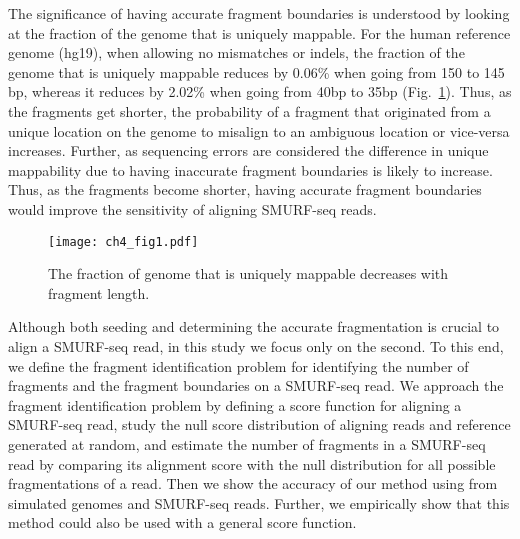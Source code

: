 The significance of having accurate fragment boundaries is understood by
looking at the fraction of the genome that is uniquely mappable. For the
human reference genome (hg19), when allowing no mismatches or indels,
the fraction of the genome that is uniquely mappable reduces by 0.06\%
when going from 150 to 145 bp, whereas it reduces by 2.02\% when going
from 40bp to 35bp (Fig.~\ref{dzones}).
Thus, as the fragments get shorter, the probability of a fragment that
originated from a unique location on the genome to misalign to an
ambiguous location or vice-versa increases.
Further, as sequencing errors are considered the difference in unique
mappability due to having inaccurate fragment boundaries is likely to
increase.
%
Thus, as the fragments become shorter, having accurate fragment
boundaries would improve the sensitivity of aligning SMURF-seq reads.

\begin{figure}[t!]
\centering
\texttt{[image: ch4\_fig1.pdf]}
\caption[Uniquely mappable fraction of the genome decreases fragment
  length]{
  The fraction of genome that is uniquely mappable decreases with
  fragment length.}
\label{dzones}
\end{figure}


Although both seeding and determining the accurate fragmentation is
crucial to align a SMURF-seq read, in this study we focus only on the
second. To this end, we define the fragment identification problem for
identifying the number of fragments and the fragment boundaries on a
SMURF-seq read.  We approach the fragment identification problem by
defining a score function for aligning a SMURF-seq read, study the null
score distribution of aligning reads and reference generated at random,
and estimate the number of fragments in a SMURF-seq read by comparing
its alignment score with the null distribution for all possible
fragmentations of a read.  Then we show the accuracy of our method using
from simulated genomes and SMURF-seq reads. Further, we empirically show
that this method could also be used with a general score function.





